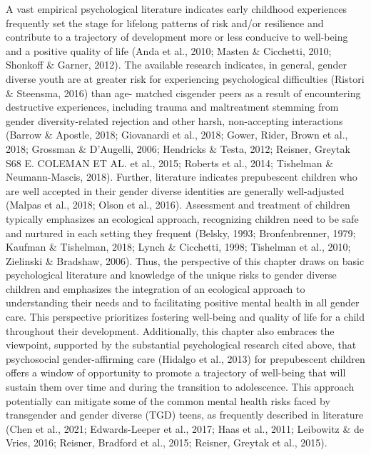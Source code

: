 \documentclass[
]{book}
\begin{document}
A vast empirical psychological literature indicates
early childhood experiences frequently set the stage
for lifelong patterns of risk and/or resilience and
contribute to a trajectory of development more or
less conducive to well-being and a positive quality
of life (Anda et al., 2010; Masten \& Cicchetti, 2010;
Shonkoff \& Garner, 2012). The available research
indicates, in general, gender diverse youth are at
greater risk for experiencing psychological difficulties (Ristori \& Steensma, 2016) than age- matched
cisgender peers as a result of encountering destructive experiences, including trauma and maltreatment
stemming from gender diversity-related rejection
and other harsh, non-accepting interactions (Barrow
\& Apostle, 2018; Giovanardi et al., 2018; Gower,
Rider, Brown et al., 2018; Grossman \& D'Augelli,
2006; Hendricks \& Testa, 2012; Reisner, Greytak
S68 E. COLEMAN ET AL.
et al., 2015; Roberts et al., 2014; Tishelman \&
Neumann-Mascis, 2018). Further, literature indicates
prepubescent children who are well accepted in
their gender diverse identities are generally
well-adjusted (Malpas et al., 2018; Olson et al.,
2016). Assessment and treatment of children typically emphasizes an ecological approach, recognizing
children need to be safe and nurtured in each setting they frequent (Belsky, 1993; Bronfenbrenner,
1979; Kaufman \& Tishelman, 2018; Lynch \&
Cicchetti, 1998; Tishelman et al., 2010; Zielinski \&
Bradshaw, 2006). Thus, the perspective of this chapter draws on basic psychological literature and
knowledge of the unique risks to gender diverse
children and emphasizes the integration of an ecological approach to understanding their needs and
to facilitating positive mental health in all gender
care. This perspective prioritizes fostering well-being
and quality of life for a child throughout their
development. Additionally, this chapter also
embraces the viewpoint, supported by the substantial psychological research cited above, that psychosocial gender-affirming care (Hidalgo et al., 2013)
for prepubescent children offers a window of opportunity to promote a trajectory of well-being that
will sustain them over time and during the transition to adolescence. This approach potentially can
mitigate some of the common mental health risks
faced by transgender and gender diverse (TGD)
teens, as frequently described in literature (Chen
et al., 2021; Edwards-Leeper et al., 2017; Haas et al.,
2011; Leibowitz \& de Vries, 2016; Reisner, Bradford
et al., 2015; Reisner, Greytak et al., 2015).
\end{document}
